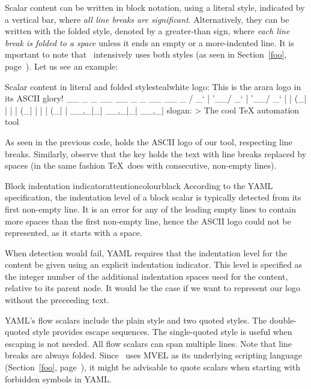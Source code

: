 Scalar content can be written in block notation, using a literal style, indicated by a vertical bar, where \emph{all line breaks are significant}. Alternatively, they can be written with the folded style, denoted by a greater-than sign, where \emph{each line break is folded to a space} unless it ends an empty or a more-indented line. It is mportant to note that \arara\ intensively uses both styles (as seen in Section~\ref{foo}, page~\pageref{foo}). Let us see an example:

\begin{codebox}{Scalar content in literal and folded styles}{teal}{\icnote}{white}
logo:
  This is the arara logo
  in its ASCII glory! 
    __ _ _ __ __ _ _ __ __ _ 
   / _` | '__/ _` | '__/ _` |
  | (_| | | | (_| | | | (_| |
   \__,_|_|  \__,_|_|  \__,_|
slogan: >
  The cool TeX
  automation tool
\end{codebox}

As seen in the previous code,  holds the ASCII logo of our tool, respecting line breaks. Similarly, observe that the  key holds the text with line breaks replaced by spaces (in the same fashion \TeX\ does with consecutive, non-empty lines).

\begin{messagebox}{Block indentation indicator}{attentioncolour}{\icattention}{black}
\setlength{\parskip}{1em}
According to the YAML specification, the indentation level of a block scalar is typically detected from its first non-empty line. It is an error for any of the leading empty lines to contain more spaces than the first non-empty line, hence the ASCII logo could not be represented, as it starts with a space.

When detection would fail, YAML requires that the indentation level for the content be given using an explicit indentation indicator. This level is specified as the integer number of the additional indentation spaces used for the content, relative to its parent node. It would be the case if we want to represent our logo without the preceeding text.
\end{messagebox}

YAML's flow scalars include the plain style and two quoted styles. The double-quoted style provides escape sequences. The single-quoted style is useful when escaping is not needed. All flow scalars can span multiple lines. Note that line breaks are always folded. Since \arara\ uses MVEL as its underlying scripting language (Section~\ref{foo}, page~\pageref{foo}), it might be advisable to quote scalars when starting with forbidden symbols in YAML.

